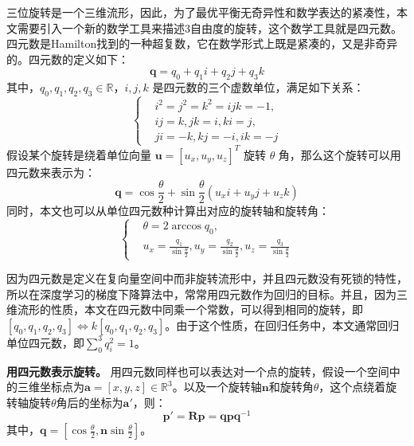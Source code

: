 三位旋转是一个三维流形，因此，为了最优平衡无奇异性和数学表达的紧凑性，本文需要引入一个新的数学工具来描述3自由度的旋转，这个数学工具就是四元数。四元数是Hamilton找到的一种超复数，它在数学形式上既是紧凑的，又是非奇异的。四元数的定义如下：
\begin{equation}
    \boldsymbol{q} = q_0 + q_1 i + q_2 j + q_3 k
\end{equation}
其中，$q_0, q_1, q_2, q_3 \in \mathbb{R}$，$i, j, k$ 是四元数的三个虚数单位，满足如下关系：
\begin{equation}
    \left\{
    \begin{aligned}
        &i^2 = j^2 = k^2 = ijk = -1, \\
        &ij = k, jk = i, ki = j, \\
        &ji = -k, kj = -i, ik = -j
    \end{aligned}
    \right.
\end{equation}
假设某个旋转是绕着单位向量 $\boldsymbol{u} = [u_x, u_y, u_z]^T$ 旋转 $\theta$ 角，那么这个旋转可以用四元数来表示为：
\begin{equation}
    \boldsymbol{q} = \cos \frac{\theta}{2} + \sin \frac{\theta}{2} (u_x i + u_y j + u_z k)
\end{equation}
同时，本文也可以从单位四元数种计算出对应的旋转轴和旋转角：
\begin{equation}
    \left\{
    \begin{aligned}
        &\theta = 2 \arccos q_0, \\
        &u_x = \frac{q_1}{\sin \frac{\theta}{2}}, u_y = \frac{q_2}{\sin \frac{\theta}{2}}, u_z = \frac{q_3}{\sin \frac{\theta}{2}}
    \end{aligned}
    \right.
\end{equation}

因为四元数是定义在复向量空间中而非旋转流形中，并且四元数没有死锁的特性，所以在深度学习的梯度下降算法中，常常用四元数作为回归的目标。并且，因为三维流形的性质，本文在四元数中同乘一个常数，可以得到相同的旋转，即$[q_0, q_1, q_2, q_3] \iff k[q_0, q_1, q_2, q_3]$。由于这个性质，在回归任务中，本文通常回归单位四元数，即$\sum_0^3 q_i^2 = 1$。

{\bf 用四元数表示旋转。} 用四元数同样也可以表达对一个点的旋转，假设一个空间中的三维坐标点为$\boldsymbol{a} = [x, y, z] \in \mathbb{R}^3$。以及一个旋转轴$\boldsymbol{n}$和旋转角$\theta$，这个点绕着旋转轴旋转$\theta$角后的坐标为$\boldsymbol{a}'$，则：
\begin{equation}
    \boldsymbol{p}' = \boldsymbol{Rp} = \boldsymbol{qpq}^{-1}
\end{equation}
其中，$\boldsymbol{q} = [\cos \frac{\theta}{2}, \boldsymbol{n} \sin \frac{\theta}{2}]$。



